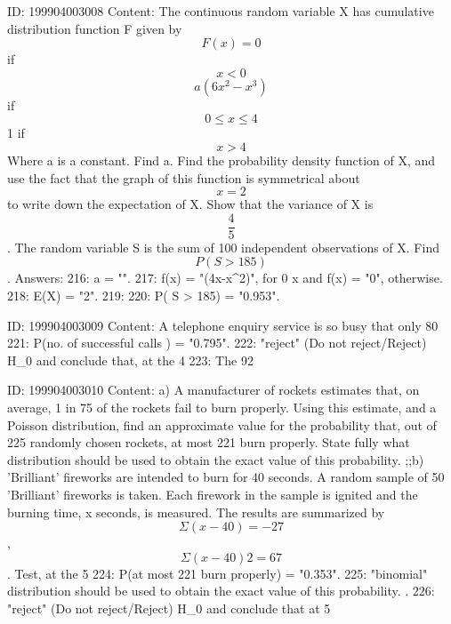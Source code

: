 \documentclass{article}
\begin{document}
ID: 199904003008
Content:
The continuous random variable X has cumulative distribution function F given by  $$F(x) = 0$$  if $$x < 0$$   $$a( 6x^{2} - x^{3})$$  if $$0 \leq x \leq 4$$ 1 if $$x > 4$$  Where a is a constant. Find a.  Find the probability density function of X, and use the fact that the graph of this function is symmetrical about $$x=2$$ to write down the expectation of X.  Show that the variance of X is $$\frac{4}{5}$$.  The random variable S is the sum of 100 independent observations of X. Find $$P(S > 185)$$. Answers:
216: a = "".
217: f(x) = "(4x-x^2)", for 0 \leq x  and f(x) = "0", otherwise.
218: E(X) = "2".
219: 
220: P( S > 185) = "0.953".

ID: 199904003009
Content:
A telephone enquiry service is so busy that only 80%
221: P(no. of successful calls ) = "0.795".
222: "reject" (Do not reject/Reject) H_0 and conclude that, at the 4%
223: The 92%

ID: 199904003010
Content:
a)  A manufacturer of rockets estimates that, on average, 1 in 75 of the rockets fail to burn properly. Using this estimate, and a Poisson distribution, find an approximate value for the probability that, out of 225 randomly chosen rockets, at most 221 burn properly.  State fully what distribution should be used to obtain the exact value of this probability. ;;b)  'Brilliant' fireworks are intended to burn for 40 seconds. A random sample of 50 'Brilliant' fireworks is taken. Each firework in the sample is ignited and the burning time, x seconds, is measured. The results are summarized by $$\Sigma(x-40) = -27$$, $$\Sigma(x-40)2=67$$. Test, at the 5%
224: P(at most 221 burn properly) = "0.353".
225: "binomial" distribution should be used to obtain the exact value of this probability. .
226: "reject" (Do not reject/Reject) H_0 and conclude that at 5%
\end{document}
